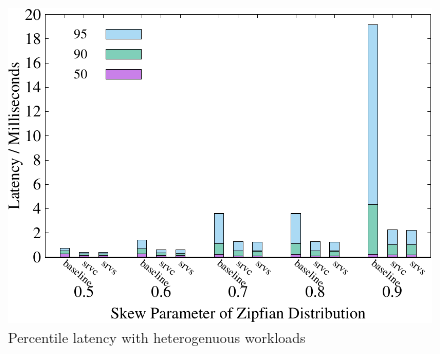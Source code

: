 \begin{figure}[t]
\begin{minipage}[b]{0.32\linewidth}
        \label{fig:weighted:abort}
    \end{minipage}
    \begin{minipage}[b]{0.32\linewidth}
            \centering
            \includegraphics[width=\textwidth]{./exp_fig/weighted_size/percent95_latency}
            \vspace{-2em}
            \caption{Percentile latency with heterogenuous workloads}
            \label{fig:weighted:p95}
        \end{minipage}
\end{figure}

